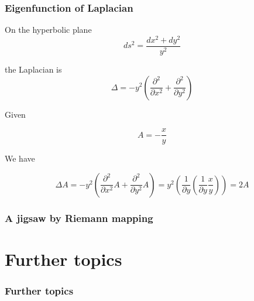 \documentclass[aspectratio=169]{beamer}
\begin{document}
\begin{frame}
\frametitle{Eigenfunction of Laplacian}
On the hyperbolic plane
\[
ds^2 = \frac{dx^2 + dy^2}{y^2}
\]

the Laplacian is
\[
\Delta = - y^2 (\frac{\partial^2}{\partial x^2} + \frac{\partial^2}{\partial y^2})
\]

Given

\begin{equation}
A = - \frac{x}{y}
\end{equation}

We have

$$
\Delta A = - y^2 (\frac{\partial^2}{\partial x^2} A + \frac{\partial^2}{\partial y^2} A) = y^2 (\frac{1}{\partial y} (\frac{1}{\partial y} \frac{x}{y})) = 2 A
$$

\end{frame}

\begin{frame}
\frametitle{A jigsaw by Riemann mapping}
\begin{figure}[ht]\centering
{}
\end{figure}
\end{frame}

\section{Further topics}

\begin{frame}
\frametitle{Further topics}
\end{frame}
\end{document}
